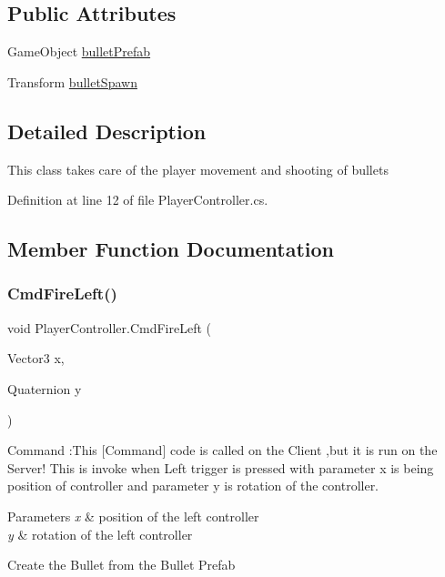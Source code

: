 \subsection*{Public Attributes}
\begin{DoxyCompactItemize}
\item 
Game\+Object \mbox{\hyperlink{class_player_controller_aa77480fc8964841ac6f4f93b99dba9d9}{bullet\+Prefab}}
\item 
Transform \mbox{\hyperlink{class_player_controller_a45263a41dbdfe88658e0b58196aeba98}{bullet\+Spawn}}
\end{DoxyCompactItemize}


\subsection{Detailed Description}
This class takes care of the player movement and shooting of bullets 



Definition at line 12 of file Player\+Controller.\+cs.



\subsection{Member Function Documentation}
\mbox{\label{class_player_controller_addacb48b01966c18cc42ffddbabb781f}} 
\subsubsection{\texorpdfstring{CmdFireLeft()}{CmdFireLeft()}}
{\footnotesize\ttfamily void Player\+Controller.\+Cmd\+Fire\+Left (\begin{DoxyParamCaption}\item[{Vector3}]{x,  }\item[{Quaternion}]{y }\end{DoxyParamCaption})}



Command \+:This \mbox{[}Command\mbox{]} code is called on the Client ,but it is run on the Server! This is invoke when Left trigger is pressed with parameter x is being position of controller and parameter y is rotation of the controller. 


\begin{DoxyParams}{Parameters}
{\em x} & position of the left controller\\
\hline
{\em y} & rotation of the left controller\\
\hline
\end{DoxyParams}
Create the Bullet from the Bullet Prefab

